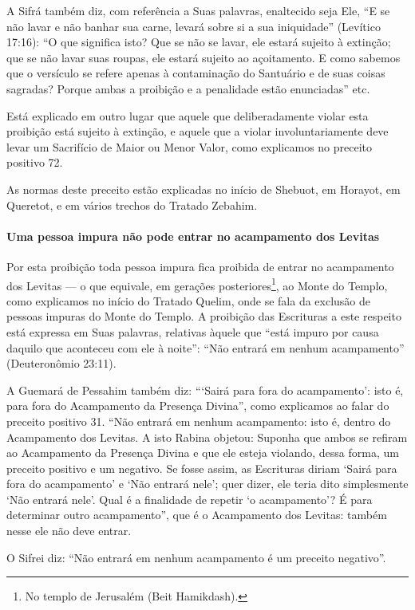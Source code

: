 A Sifrá também diz, com referência a Suas palavras, enaltecido seja Ele,
``E se não lavar e não banhar sua carne, levará sobre si a sua
iniquidade'' (Levítico 17:16): ``O que significa isto? Que se não se
lavar, ele estará sujeito à extinção; que se não lavar suas roupas, ele
estará sujeito ao açoitamento. E como sabemos que o versículo se refere
apenas à contaminação do Santuário e de suas coisas sagradas? Porque
ambas a proibição e a penalidade estão enunciadas'' etc.

Está explicado em outro lugar que aquele que deliberadamente violar
esta proibição está sujeito à extinção, e aquele que a violar
involuntariamente deve levar um Sacrifício de Maior ou Menor Valor,
como explicamos no preceito positivo 72.

As normas deste preceito estão explicadas no início de Shebuot, em
Horayot, em Queretot, e em vários trechos do Tratado Zebahim.

\paragraph{Uma pessoa impura não pode entrar no acampamento dos Levitas}

Por esta proibição toda pessoa impura fica proibida de entrar no
acampamento dos Levitas --- o que equivale, em gerações
posteriores\footnote{No templo de Jerusalém (Beit Hamikdash).}, ao Monte do Templo, como explicamos
no início do Tratado Quelim, onde se fala da exclusão de pessoas
impuras do Monte do Templo. A proibição das Escrituras a este respeito
está expressa em Suas palavras, relativas àquele que ``está impuro por
causa daquilo que aconteceu com ele à noite'': ``Não entrará em nenhum
acampamento'' (Deuteronômio 23:11).

A Guemará de Pessahim também diz: ```Sairá para fora do acampamento':
isto é, para fora do Acampamento da Presença Divina'', como explicamos
ao falar do preceito positivo 31. ``Não entrará em nenhum acampamento:
isto é, dentro do Acampamento dos Levitas. A isto Rabina objetou:
Suponha que ambos se refiram ao Acampamento da Presença Divina e que
ele esteja violando, dessa forma, um preceito positivo e um negativo. Se
fosse assim, as Escrituras diriam `Sairá para fora do acampamento' e
`Não entrará nele'; quer dizer, ele teria dito simplesmente `Não entrará
nele'. Qual é a finalidade de repetir `o acampamento'? É para
determinar outro acampamento'', que é o Acampamento dos Levitas: também
nesse ele não deve entrar.

O Sifrei diz: ``Não entrará em nenhum acampamento é um preceito
negativo''.

